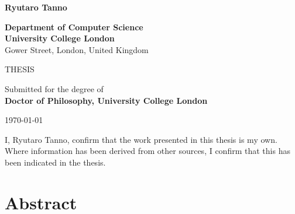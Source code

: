 \documentclass[12pt,a4paper,twoside]{book}
\begin{document}
\begin{titlepage}
\begin{center}
{\vspace{5em}
\LARGE \textbf{Ryutaro Tanno}
 \vspace{3em}%
\begin{center}%
	\large
	\textbf{Department of Computer Science} \\
	\textbf{University College London}\\
	Gower Street, London, United Kingdom\\
\end{center}%
\vspace{4em}%


\begin{center}%
	\large THESIS %
	\vspace{1em}
\end{center}%

 \begin{center}%
 	\large
	Submitted for the degree of \\
	\textbf{Doctor of Philosophy, University College London} \\
\end{center}%
\vspace{1em}%



 \vfill
% 
% 

{\Large \today}

}
\end{center}
\end{titlepage}


\clearpage


I, Ryutaro Tanno, confirm that the work presented in this thesis is my own. Where information has been derived from other sources, I confirm that this has been indicated in the thesis.

\clearpage


\chapter*{Abstract}
% 
\end{document}
